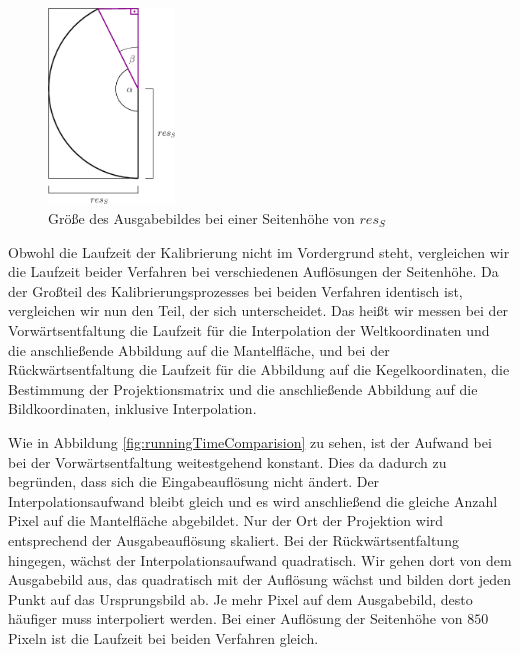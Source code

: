 \begin{figure}[!htb]
	\centering
	\includegraphics[width=0.3\textwidth]{images/sizeOutput.eps}
	\caption{Größe des Ausgabebildes bei einer Seitenhöhe von $res_S$}
	\label{fig:sizeOutput}
\end{figure}


Obwohl die Laufzeit der Kalibrierung nicht im Vordergrund steht, vergleichen wir die Laufzeit beider Verfahren bei verschiedenen Auflösungen der Seitenhöhe. Da der Großteil des Kalibrierungsprozesses bei beiden Verfahren identisch ist, vergleichen wir nun den Teil, der sich unterscheidet. Das heißt wir messen bei der Vorwärtsentfaltung die Laufzeit für die Interpolation der Weltkoordinaten und die anschließende Abbildung auf die Mantelfläche, und bei der Rückwärtsentfaltung die Laufzeit für die Abbildung auf die Kegelkoordinaten, die Bestimmung der Projektionsmatrix und die anschließende Abbildung auf die Bildkoordinaten, inklusive Interpolation.


Wie in Abbildung \ref{fig:runningTimeComparision} zu sehen, ist der Aufwand bei bei der Vorwärtsentfaltung weitestgehend konstant. Dies da dadurch zu begründen, dass sich die Eingabeauflösung nicht ändert. Der Interpolationsaufwand bleibt gleich und es wird anschließend die gleiche Anzahl Pixel auf die Mantelfläche abgebildet. Nur der Ort der Projektion wird entsprechend der Ausgabeauflösung skaliert. 
Bei der Rückwärtsentfaltung hingegen, wächst der Interpolationsaufwand quadratisch. Wir gehen dort von dem Ausgabebild aus, das quadratisch mit der Auflösung wächst und bilden dort jeden Punkt auf das Ursprungsbild ab. Je mehr Pixel auf dem Ausgabebild, desto häufiger muss interpoliert werden. Bei einer Auflösung der Seitenhöhe von $850$ Pixeln ist die Laufzeit bei beiden Verfahren gleich. 

